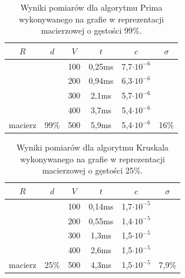 \documentclass[a4paper,12pt]{article}
\begin{document}
\begin{table}[H]
	\centering
	\caption{\centering Wyniki pomiarów dla algorytmu Prima wykonywanego na grafie w reprezentacji macierzowej o gęstości 99\%.}
	\begin{tabular}{|c|c|c|c|c|c|}
		\hline
		\rowcolor[HTML]{C0C0C0} 
		$R$                       & $d$                    & $V$ & \multicolumn{1}{c|}{\cellcolor[HTML]{C0C0C0}$t$} & $c$                & $\sigma$               \\ \hline
		&                        & 100 & 0,25ms                                           & 7,7$\cdot 10^{-6}$ &                        \\ \cline{3-5}
		&                        & 200 & 0,94ms                                           & 6,3$\cdot 10^{-6}$ &                        \\ \cline{3-5}
		&                        & 300 & 2,1ms                                            & 5,7$\cdot 10^{-6}$ &                        \\ \cline{3-5}
		&                        & 400 & 3,7ms                                            & 5,4$\cdot 10^{-6}$ &                        \\ \cline{3-5}
		\multirow{-5}{*}{macierz} & \multirow{-5}{*}{99\%} & 500 & 5,9ms                                            & 5,4$\cdot 10^{-6}$ & \multirow{-5}{*}{16\%} \\ \hline
	\end{tabular}
\end{table}

\begin{table}[H]
	\centering
	\caption{\centering Wyniki pomiarów dla algorytmu Kruskala wykonywanego na grafie w reprezentacji macierzowej o gęstości 25\%.}
	\begin{tabular}{|c|c|c|c|c|c|}
		\hline
		\rowcolor[HTML]{C0C0C0} 
		$R$                       & $d$                    & $V$ & \multicolumn{1}{c|}{\cellcolor[HTML]{C0C0C0}$t$} & $c$                & $\sigma$                \\ \hline
		&                        & 100 & 0,14ms                                           & 1,7$\cdot 10^{-5}$ &                         \\ \cline{3-5}
		&                        & 200 & 0,55ms                                           & 1,4$\cdot 10^{-5}$ &                         \\ \cline{3-5}
		&                        & 300 & 1,3ms                                            & 1,5$\cdot 10^{-5}$ &                         \\ \cline{3-5}
		&                        & 400 & 2,6ms                                            & 1,5$\cdot 10^{-5}$ &                         \\ \cline{3-5}
		\multirow{-5}{*}{macierz} & \multirow{-5}{*}{25\%} & 500 & 4,3ms                                            & 1,5$\cdot 10^{-5}$ & \multirow{-5}{*}{7,9\%} \\ \hline
	\end{tabular}
\end{table}
\end{document}
